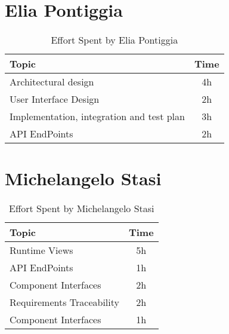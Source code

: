 \section*{Elia Pontiggia}
\begin{table}[H]
    \renewcommand{\arraystretch}{1.5}
    \centering
    \begin{tabular}{|l|c|}
        \hline
        \textbf{Topic}                            & \textbf{Time} \\ \hline
        Architectural design                      & 4h            \\ \hline
        User Interface Design                     & 2h            \\ \hline
        Implementation, integration and test plan & 3h            \\ \hline
        API EndPoints                             & 2h            \\ \hline
    \end{tabular}
    \caption{Effort Spent by Elia Pontiggia}
    \label{tab:pontiggia-effort-spent}
\end{table}

\section*{Michelangelo Stasi}
\begin{table}[H]
    \renewcommand{\arraystretch}{1.5}
    \centering
    \begin{tabular}{|l|c|}
        \hline
        \textbf{Topic}            & \textbf{Time} \\ \hline
        Runtime Views             & 5h            \\ \hline
        API EndPoints             & 1h            \\ \hline
        Component Interfaces      & 2h            \\ \hline
        Requirements Traceability & 2h            \\ \hline
        Component Interfaces      & 1h            \\ \hline
    \end{tabular}
    \caption{Effort Spent by Michelangelo Stasi}
    \label{tab:stasi-effort-spent}
\end{table}
